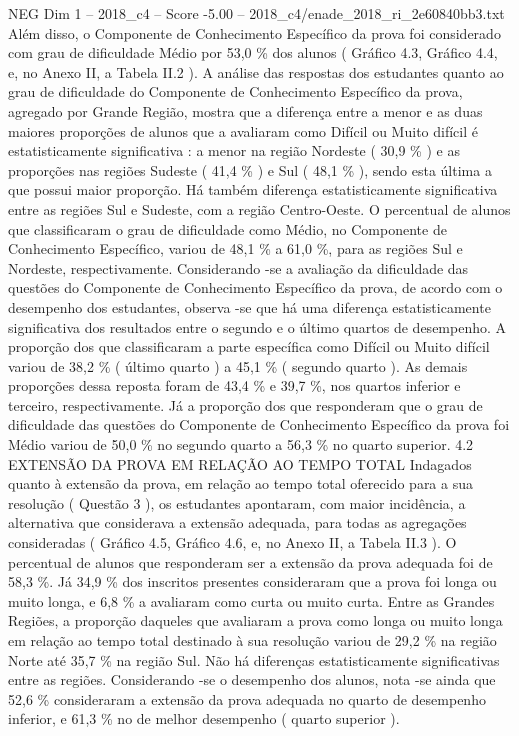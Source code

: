 \begin{textsample}{NEG Dim 1 – 2018\_c4 – Score -5.00 – 2018\_c4/enade\_2018\_ri\_2e60840bb3.txt}
Além disso, o Componente de Conhecimento Específico da prova foi considerado com grau de dificuldade Médio por 53,0 \% dos alunos ( Gráfico 4.3, Gráfico 4.4, e, no Anexo II, a Tabela II.2 ).
A análise das respostas dos estudantes quanto ao grau de dificuldade do Componente de Conhecimento Específico da prova, agregado por Grande Região, mostra que a diferença entre a menor e as duas maiores proporções de alunos que a avaliaram como Difícil ou Muito difícil é estatisticamente significativa : a menor na região Nordeste ( 30,9 \% ) e as proporções nas regiões Sudeste ( 41,4 \% ) e Sul ( 48,1 \% ), sendo esta última a que possui maior proporção.
Há também diferença estatisticamente significativa entre as regiões Sul e Sudeste, com a região Centro-Oeste.
O percentual de alunos que classificaram o grau de dificuldade como Médio, no Componente de Conhecimento Específico, variou de 48,1 \% a 61,0 \%, para as regiões Sul e Nordeste, respectivamente.
Considerando -se a avaliação da dificuldade das questões do Componente de Conhecimento Específico da prova, de acordo com o desempenho dos estudantes, observa -se que há uma diferença estatisticamente significativa dos resultados entre o segundo e o último quartos de desempenho.
A proporção dos que classificaram a parte específica como Difícil ou Muito difícil variou de 38,2 \% ( último quarto ) a 45,1 \% ( segundo quarto ).
As demais proporções dessa reposta foram de 43,4 \% e 39,7 \%, nos quartos inferior e terceiro, respectivamente.
Já a proporção dos que responderam que o grau de dificuldade das questões do Componente de Conhecimento Específico da prova foi Médio variou de 50,0 \% no segundo quarto a 56,3 \% no quarto superior. 4.2 EXTENSÃO DA PROVA EM RELAÇÃO AO TEMPO TOTAL Indagados quanto à extensão da prova, em relação ao tempo total oferecido para a sua resolução ( Questão 3 ), os estudantes apontaram, com maior incidência, a alternativa que considerava a extensão adequada, para todas as agregações consideradas ( Gráfico 4.5, Gráfico 4.6, e, no Anexo II, a Tabela II.3 ).
O percentual de alunos que responderam ser a extensão da prova adequada foi de 58,3 \%.
Já 34,9 \% dos inscritos presentes consideraram que a prova foi longa ou muito longa, e 6,8 \% a avaliaram como curta ou muito curta.
Entre as Grandes Regiões, a proporção daqueles que avaliaram a prova como longa ou muito longa em relação ao tempo total destinado à sua resolução variou de 29,2 \% na região Norte até 35,7 \% na região Sul.
Não há diferenças estatisticamente significativas entre as regiões.
Considerando -se o desempenho dos alunos, nota -se ainda que 52,6 \% consideraram a extensão da prova adequada no quarto de desempenho inferior, e 61,3 \% no de melhor desempenho ( quarto superior ).

\end{textsample}
